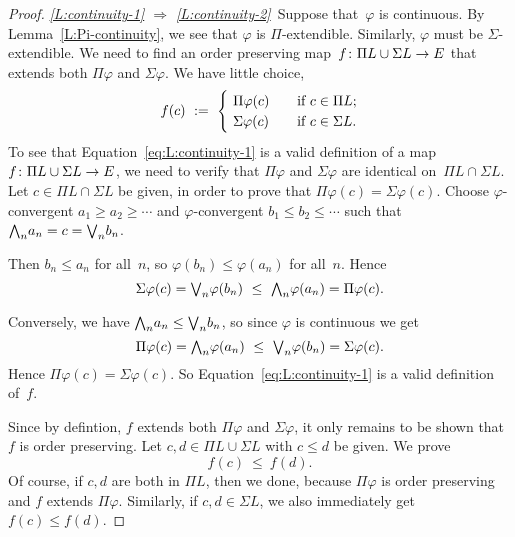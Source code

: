 \documentclass[main.tex]{subfiles}
\begin{document}
\begin{proof}
\noindent
\emph{\ref{L:continuity-1}
$\Longrightarrow$
\ref{L:continuity-2}}\ 
Suppose that~$\varphi$ is continuous.
By Lemma~\ref{L:Pi-continuity},
we see that $\varphi$ is $\Pi$-extendible.
Similarly, $\varphi$ must be $\Sigma$-extendible.
We need to find an order preserving map~$f\colon \Pi L \cup \Sigma L \rightarrow E$
that extends both $\Pi\varphi$ and $\Sigma\varphi$.
We have little choice,
\begin{equation}
\label{eq:L:continuity-1}
f(c) \ \eqdf \ 
\begin{cases}
\ \Pi\varphi(c) \quad& \text{if }c\in \Pi L;\\
\ \Sigma\varphi(c) \quad& \text{if }c\in \Sigma L.
\end{cases}
\end{equation}
To see that Equation~\eqref{eq:L:continuity-1}
is a valid definition of a 
map $f\colon \Pi L \cup \Sigma L \rightarrow E$,
we need to verify that $\Pi\varphi$ and $\Sigma\varphi$
are identical on~$\Pi L \cap \Sigma L$.
Let $c\in \Pi L \cap \Sigma L$
be given,
in order to prove that $\Pi\varphi(c) = \Sigma\varphi(c)$.
Choose $\varphi$-convergent
$a_1 \geq a_2 \geq \dotsb$ and
$\varphi$-convergent
$b_1 \leq b_2 \leq \dotsb$
such that $\textstyle{\bigwedge}_n a_n =c= \textstyle{\bigvee}_n b_n$.

Then $b_n \leq a_n$ for all~$n$, so
$\varphi(b_n)\leq \varphi(a_n)$ for all~$n$.
Hence
\begin{equation*}
\Sigma\varphi(c)
=\textstyle{\bigvee}_n \varphi(b_n)
\ \leq\ \textstyle{\bigwedge}_n \varphi(a_n)
=\Pi\varphi(c).
\end{equation*}

Conversely,
we have $\textstyle{\bigwedge}_n a_n \leq \textstyle{\bigvee}_n b_n$,
so since $\varphi$ is continuous we get
\begin{equation*}
\Pi\varphi(c)
=\textstyle{\bigwedge}_n \varphi(a_n)
\ \leq\ \textstyle{\bigvee}_n \varphi(b_n)
=\Sigma\varphi(c).
\end{equation*}
Hence $\Pi\varphi(c)=\Sigma\varphi(c)$.
So Equation~\eqref{eq:L:continuity-1}
is a valid definition of~$f$.

Since by defintion,
$f$ extends both $\Pi\varphi$ and $\Sigma\varphi$,
it only remains to be shown that~$f$ is order preserving.
Let $c,d\in \Pi L \cup \Sigma L$
with $c\leq d$ be given.
We prove
\begin{equation*}
f(c)\ \leq\  f(d).
\end{equation*}
Of course,
if $c,d$ are both in $\Pi L$,
then we done,
because $\Pi \varphi$
is order preserving 
and $f$ extends $\Pi\varphi$.
Similarly, if $c,d\in\Sigma L$, 
we also immediately get $f(c)\leq f(d)$.


\end{proof}
\end{document}
